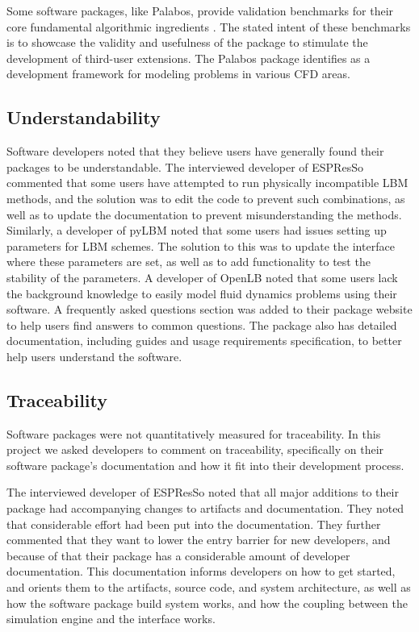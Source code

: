 \documentclass[final, 3p, times, authoryear]{elsarticle}
\begin{document}
Some software packages, like Palabos, provide validation benchmarks for their
core fundamental algorithmic ingredients \citep{latt2021palabos}. The stated
intent of these benchmarks is to showcase the validity and usefulness of the
package to stimulate the development of third-user extensions. The Palabos
package identifies as a development framework for modeling problems in various
CFD areas. 

\subsection{Understandability}

Software developers noted that they believe users have generally found their
packages to be understandable. The interviewed developer of ESPResSo commented
that some users have attempted to run physically incompatible LBM methods, and
the solution was to edit the code to prevent such combinations, as well as to
update the documentation to prevent misunderstanding the methods. Similarly, a
developer of pyLBM noted that some users had issues setting up parameters for
LBM schemes. The solution to this was to update the interface where these
parameters are set, as well as to add functionality to test the stability of the
parameters. A developer of OpenLB noted that some users lack the background
knowledge to easily model fluid dynamics problems using their software. A
frequently asked questions section was added to their package website to help
users find answers to common questions. The package also has detailed
documentation, including guides and usage requirements specification, to better
help users understand the software.

\subsection{Traceability}

Software packages were not quantitatively measured for traceability. In this
project we asked developers to comment on traceability, specifically on their
software package's documentation and how it fit into their development process. 

The interviewed developer of ESPResSo noted that all major additions to their
package had accompanying changes to artifacts and documentation. They noted that
considerable effort had been put into the documentation. They further commented
that they want to lower the entry barrier for new developers, and because of
that their package has a considerable amount of developer documentation. This
documentation informs developers on how to get started, and orients them to the
artifacts, source code, and system architecture, as well as how the software
package build system works, and how the coupling between the simulation engine
and the interface works. 
\end{document}

